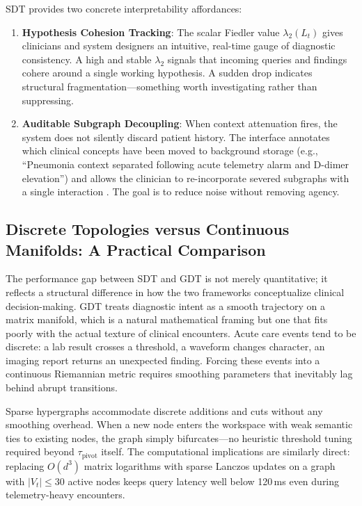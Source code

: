 \documentclass[10pt, onecolumn]{article}
\begin{document}
SDT provides two concrete interpretability affordances:
\begin{enumerate}[(1)]
  \item \textbf{Hypothesis Cohesion Tracking}: The scalar Fiedler value $\lambda_2(L_t)$ gives clinicians and system designers an intuitive, real-time gauge of diagnostic consistency. A high and stable $\lambda_2$ signals that incoming queries and findings cohere around a single working hypothesis. A sudden drop indicates structural fragmentation---something worth investigating rather than suppressing.
  \item \textbf{Auditable Subgraph Decoupling}: When context attenuation fires, the system does not silently discard patient history. The interface annotates which clinical concepts have been moved to background storage (e.g., ``Pneumonia context separated following acute telemetry alarm and D-dimer elevation'') and allows the clinician to re-incorporate severed subgraphs with a single interaction \cite{goddard2012automation,croskerry2002achieving}. The goal is to reduce noise without removing agency.
\end{enumerate}

\subsection{Discrete Topologies versus Continuous Manifolds: A Practical Comparison}

The performance gap between SDT and GDT is not merely quantitative; it reflects a structural difference in how the two frameworks conceptualize clinical decision-making. GDT treats diagnostic intent as a smooth trajectory on a matrix manifold, which is a natural mathematical framing but one that fits poorly with the actual texture of clinical encounters. Acute care events tend to be discrete: a lab result crosses a threshold, a waveform changes character, an imaging report returns an unexpected finding. Forcing these events into a continuous Riemannian metric requires smoothing parameters that inevitably lag behind abrupt transitions.

Sparse hypergraphs accommodate discrete additions and cuts without any smoothing overhead. When a new node enters the workspace with weak semantic ties to existing nodes, the graph simply bifurcates---no heuristic threshold tuning required beyond $\tau_{\text{pivot}}$ itself. The computational implications are similarly direct: replacing $O(d^3)$ matrix logarithms with sparse Lanczos updates on a graph with $|V_t| \le 30$ active nodes keeps query latency well below 120\,ms even during telemetry-heavy encounters.
\end{document}
